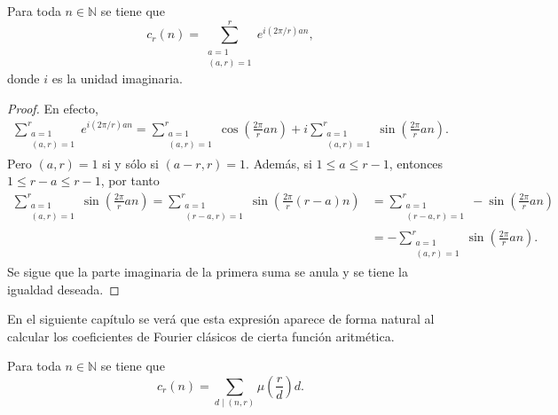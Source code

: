 \thispagestyle{easter1}
\begin{proposition}
Para toda $n \in \mathbb{N}$ se tiene que
\begin{equation*}
    c_r(n) = \sum_{\substack{a=1 \\ (a,r)=1}}^{r} e^{i(2 \pi /r) a n},
\end{equation*}
donde $i$ es la unidad imaginaria.
\end{proposition}

\begin{proof}
En efecto,
\begin{align*}
    \sum_{\substack{a=1 \\ (a,r)=1}}^{r} e^{i(2 \pi / r) a n} = \sum_{\substack{a=1 \\ (a,r)=1}}^{r} \cos \left( \frac{2 \pi}{r} a n \right) + i \sum_{\substack{a=1 \\ (a,r)=1}}^{r} \sin \left( \frac{2 \pi}{r} a n \right).
\end{align*}
Pero $(a,r)=1$ si y sólo si $(a-r,r)=1$. Además, si $1 \le a \le r-1$, entonces $1 \le r-a \le r-1$, por tanto
\begin{align*}
    \sum_{\substack{a=1 \\ (a,r)=1}}^{r} \sin \left( \frac{2 \pi}{r} a n \right) = \sum_{\substack{a=1 \\ (r-a,r)=1}}^{r} \sin \left( \frac{2 \pi}{r} (r-a) n \right) & = \sum_{\substack{a=1 \\ (r-a,r)=1}}^{r} - \sin \left( \frac{2 \pi}{r} a n \right) \\
                                                                                 &= - \sum_{\substack{a=1 \\ (a,r)=1}}^{r} \sin \left( \frac{2 \pi}{r} a n \right).
\end{align*}
Se sigue que la parte imaginaria de la primera suma se anula y se tiene la igualdad deseada.
\end{proof}

En el siguiente capítulo se verá que esta expresión aparece de forma natural al calcular los coeficientes de Fourier clásicos de cierta función aritmética.

\begin{proposition}\label{prop:ram0}
Para toda $n \in \mathbb{N}$ se tiene que
\begin{equation*}
    c_r(n) = \sum_{d \mid (n,r)} \mu \left( \frac{r}{d} \right) d.
\end{equation*}
\end{proposition}

